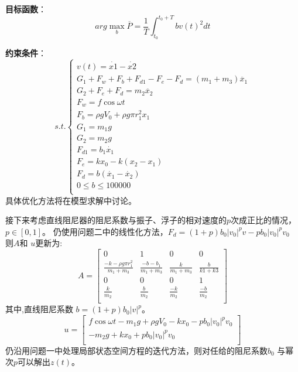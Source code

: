 \documentclass[withoutpreface,bwprint]{cumcmthesis} %
\begin{document}
    \textbf{目标函数}：
    \begin{equation}
        arg \max_{b} \overline{P} = \frac{1}{T}\int_{t_0}^{t_0 + T}bv(t)^2 dt
        \label{eq:target_1}
    \end{equation}

    \textbf{约束条件}：
    \begin{equation}
        s.t.
        \begin{cases}
            v(t) = \dot{x1} - \dot{x2}\\
            G_1 + F_w + F_b + F_{d1} - F_e - F_d = (m_1 + m_3) \ddot{x_1}\\
            G_2 + F_e + F_d = m_2 \ddot{x_2}\\
            F_w = f \cos\omega t \\
            F_b = \rho g V_0 + \rho g \pi r_1^2 x_1\\
            G_1 = m_1 g\\
            G_2 = m_2 g\\
            F_{d1} = b_1\dot{x_1}\\
            F_e = k x_0 - k(x_2 - x_1)\\
            F_d = b(\dot{x_1} - \dot{x_2})\\
            0 \leq b \leq 100000 \\
        \end{cases}
        \label{eq:control_1}
    \end{equation}
    具体优化方法将在模型求解中讨论。

    接下来考虑直线阻尼器的阻尼系数与振子、浮子的相对速度的$p$次成正比的情况，$p \in[0, 1]$。
    仍使用问题二中的线性化方法，$ F_d = (1 + p) b_0 {\left| v_0 \right|}^p v - p b_0{\left| v_0 \right|}^ p v_0  $
    则$ A $和 $ u $更新为:
    $$
    A = \left [
        \begin{array}{cccc}
            0&1&0&0 \\
            \frac{-k -\rho g \pi r_1^2}{m_1 + m_3} & \frac{-b - b_1}{m_1 + m_3}
            & \frac{k}{m_1 + m_3} & \frac{b}{k1 + k3}\\
            0&0&0&1 \\
            \frac{k}{m_2}& \frac{b}{m_2} & \frac{-k}{m_2} & \frac{-b}{m_2}\\
        \end{array} \right ]
    $$其中,直线阻尼系数 $b = (1+p) b_0 |v|^p$。
    $$
    u = \left [
        \begin{array}{c}
            f\cos \omega t - m_1 g + \rho g V_0 - k x_0 - p b_0 |v_0|^{p}v_0\\
            -m_2 g + k x_0 + p b_0 |v_0|^{p}v_0 \\
        \end{array} \right ]
    $$
    仍沿用问题一中处理局部状态空间方程的迭代方法，则对任给的阻尼系数$ b_0 $ 与幂次$ p $可以解出$ z(t) $。
\end{document}
